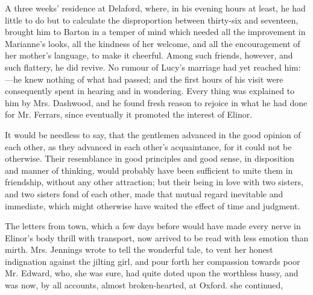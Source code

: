 A three weeks' residence at Delaford, where, in his evening hours at least, he had little to do but to calculate the disproportion between thirty-six and seventeen, brought him to Barton in a temper of mind which needed all the improvement in Marianne's looks, all the kindness of her welcome, and all the encouragement of her mother's language, to make it cheerful. Among such friends, however, and such flattery, he did revive. No rumour of Lucy's marriage had yet reached him:---he knew nothing of what had passed; and the first hours of his visit were consequently spent in hearing and in wondering. Every thing was explained to him by Mrs. Dashwood, and he found fresh reason to rejoice in what he had done for Mr. Ferrars, since eventually it promoted the interest of Elinor.

It would be needless to say, that the gentlemen advanced in the good opinion of each other, as they advanced in each other's acquaintance, for it could not be otherwise. Their resemblance in good principles and good sense, in disposition and manner of thinking, would probably have been sufficient to unite them in friendship, without any other attraction; but their being in love with two sisters, and two sisters fond of each other, made that mutual regard inevitable and immediate, which might otherwise have waited the effect of time and judgment.

The letters from town, which a few days before would have made every nerve in Elinor's body thrill with transport, now arrived to be read with less emotion than mirth. Mrs. Jennings wrote to tell the wonderful tale, to vent her honest indignation against the jilting girl, and pour forth her compassion towards poor Mr. Edward, who, she was sure, had quite doted upon the worthless hussy, and was now, by all accounts, almost broken-hearted, at Oxford.  she continued, 

